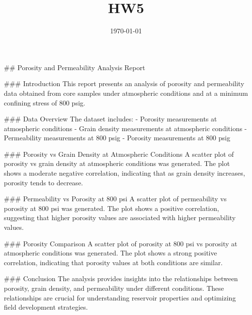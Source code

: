 \documentclass{article}
\title{HW5}
\date{\today}
\begin{document}
\maketitle
## Porosity and Permeability Analysis Report

### Introduction
This report presents an analysis of porosity and permeability data obtained from core samples under atmospheric conditions and at a minimum confining stress of 800 psig.

### Data Overview
The dataset includes:
- Porosity measurements at atmospheric conditions
- Grain density measurements at atmospheric conditions
- Permeability measurements at 800 psig
- Porosity measurements at 800 psig

### Porosity vs Grain Density at Atmospheric Conditions
A scatter plot of porosity vs grain density at atmospheric conditions was generated. The plot shows a moderate negative correlation, indicating that as grain density increases, porosity tends to decrease.

### Permeability vs Porosity at 800 psi
A scatter plot of permeability vs porosity at 800 psi was generated. The plot shows a positive correlation, suggesting that higher porosity values are associated with higher permeability values.

### Porosity Comparison
A scatter plot of porosity at 800 psi vs porosity at atmospheric conditions was generated. The plot shows a strong positive correlation, indicating that porosity values at both conditions are similar.

### Conclusion
The analysis provides insights into the relationships between porosity, grain density, and permeability under different conditions. These relationships are crucial for understanding reservoir properties and optimizing field development strategies.
\end{document}
